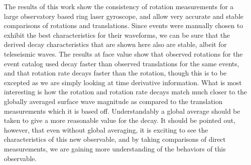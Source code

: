 \documentclass{gji}
\begin{document}
The results of this work show the consistency of rotation measurements for a large observatory based ring laser gyroscope, and allow very accurate and stable comparisons of rotations and translations. Since events were manually chosen to exhibit the best characteristics for their waveforms, we can be sure that the derived decay characteristics that are shown here also are stable, albeit for teleseismic waves. The results at face value show that observed rotations for the event catalog used decay faster than observed translations for the same events, and that rotation rate decays faster than the rotation, though this is to be excepted as we are simply looking at time derivative information. What is most interesting is how the rotation and rotation rate decays match much closer to the globally averaged surface wave magnitude as compared to the translation measurements which it is based off. Understandably a global average should be taken to give a more reasonable value for the decay. It should be pointed out, however, that even without global averaging, it is exciting to see the characteristics of this new observable, and by taking comparisons of direct measurements, we are gaining more understanding of the behaviors of this observable.


\label{lastpage}
\end{document}
